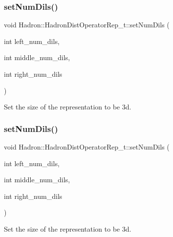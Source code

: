 \subsubsection{\texorpdfstring{setNumDils()}{setNumDils()}\hspace{0.1cm}{\footnotesize\ttfamily [3/6]}}
{\footnotesize\ttfamily void Hadron\+::\+Hadron\+Dist\+Operator\+Rep\+\_\+t\+::set\+Num\+Dils (\begin{DoxyParamCaption}\item[{int}]{left\+\_\+num\+\_\+dils,  }\item[{int}]{middle\+\_\+num\+\_\+dils,  }\item[{int}]{right\+\_\+num\+\_\+dils }\end{DoxyParamCaption})}



Set the size of the representation to be 3d. 

\mbox{\label{classHadron_1_1HadronDistOperatorRep__t_a3e971d8bbb79f0024b87f54b4db56083}} 
\subsubsection{\texorpdfstring{setNumDils()}{setNumDils()}\hspace{0.1cm}{\footnotesize\ttfamily [4/6]}}
{\footnotesize\ttfamily void Hadron\+::\+Hadron\+Dist\+Operator\+Rep\+\_\+t\+::set\+Num\+Dils (\begin{DoxyParamCaption}\item[{int}]{left\+\_\+num\+\_\+dils,  }\item[{int}]{middle\+\_\+num\+\_\+dils,  }\item[{int}]{right\+\_\+num\+\_\+dils }\end{DoxyParamCaption})}



Set the size of the representation to be 3d. 

\mbox{\label{classHadron_1_1HadronDistOperatorRep__t_ae1052d3d087b32a01f02eda6e802d196}} 
